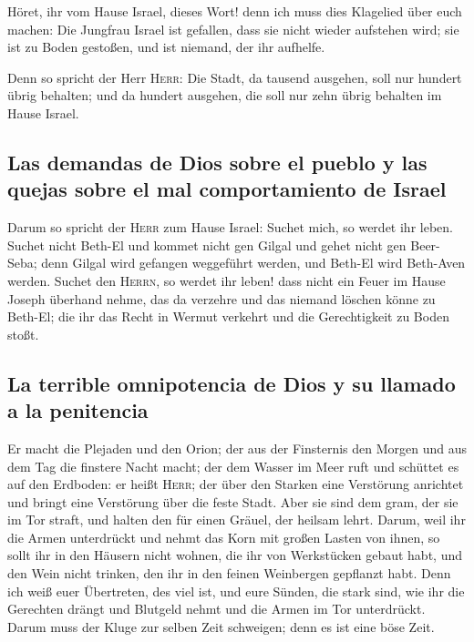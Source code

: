  Höret, ihr vom Hause Israel, dieses Wort! denn ich muss
dies Klagelied über euch machen:  Die Jungfrau Israel ist
gefallen, dass sie nicht wieder aufstehen wird; sie ist zu Boden
gestoßen, und ist niemand, der ihr aufhelfe.

 Denn so spricht der Herr \textsc{Herr}: Die Stadt, da
tausend ausgehen, soll nur hundert übrig behalten; und da hundert
ausgehen, die soll nur zehn übrig behalten im Hause Israel.

\hypertarget{las-demandas-de-dios-sobre-el-pueblo-y-las-quejas-sobre-el-mal-comportamiento-de-israel}{%
\subsection{Las demandas de Dios sobre el pueblo y las quejas sobre el
mal comportamiento de
Israel}\label{las-demandas-de-dios-sobre-el-pueblo-y-las-quejas-sobre-el-mal-comportamiento-de-israel}}

 Darum so spricht der \textsc{Herr} zum Hause Israel:
Suchet mich, so werdet ihr leben.  Suchet nicht Beth-El
und kommet nicht gen Gilgal und gehet nicht gen Beer-Seba; denn Gilgal
wird gefangen weggeführt werden, und Beth-El wird Beth-Aven werden.
 Suchet den \textsc{Herrn}, so werdet ihr leben! dass
nicht ein Feuer im Hause Joseph überhand nehme, das da verzehre und das
niemand löschen könne zu Beth-El;  die ihr das Recht in
Wermut verkehrt und die Gerechtigkeit zu Boden stoßt.

\hypertarget{la-terrible-omnipotencia-de-dios-y-su-llamado-a-la-penitencia}{%
\subsection{La terrible omnipotencia de Dios y su llamado a la
penitencia}\label{la-terrible-omnipotencia-de-dios-y-su-llamado-a-la-penitencia}}

 Er macht die Plejaden und den Orion; der aus der
Finsternis den Morgen und aus dem Tag die finstere Nacht macht; der dem
Wasser im Meer ruft und schüttet es auf den Erdboden: er heißt
\textsc{Herr};  der über den Starken eine Verstörung
anrichtet und bringt eine Verstörung über die feste Stadt.
 Aber sie sind dem gram, der sie im Tor straft, und
halten den für einen Gräuel, der heilsam lehrt.  Darum,
weil ihr die Armen unterdrückt und nehmt das Korn mit großen Lasten von
ihnen, so sollt ihr in den Häusern nicht wohnen, die ihr von Werkstücken
gebaut habt, und den Wein nicht trinken, den ihr in den feinen
Weinbergen gepflanzt habt.  Denn ich weiß euer
Übertreten, des viel ist, und eure Sünden, die stark sind, wie ihr die
Gerechten drängt und Blutgeld nehmt und die Armen im Tor unterdrückt.
 Darum muss der Kluge zur selben Zeit schweigen; denn es
ist eine böse Zeit.


